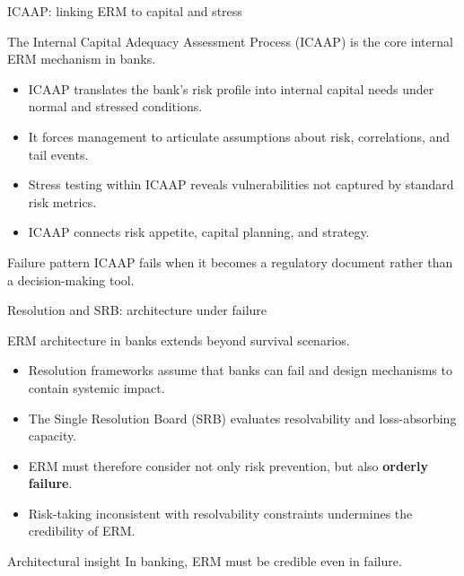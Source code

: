 \documentclass[aspectratio=169, 10pt]{beamer} %
\begin{document}
\begin{frame}{ICAAP: linking ERM to capital and stress}

The Internal Capital Adequacy Assessment Process (ICAAP)
is the core internal ERM mechanism in banks.

\medskip

\begin{itemize}
  \item[$\bullet$] ICAAP translates the bank’s risk profile into internal
  capital needs under normal and stressed conditions.

  \item[$\bullet$] It forces management to articulate assumptions about
  risk, correlations, and tail events.

  \item[$\bullet$] Stress testing within ICAAP reveals vulnerabilities
  not captured by standard risk metrics.

  \item[$\bullet$] ICAAP connects risk appetite, capital planning, and strategy.
\end{itemize}

\begin{block}{Failure pattern}
ICAAP fails when it becomes a regulatory document rather than a
decision-making tool.
\end{block}

\end{frame}

\begin{frame}{Resolution and SRB: architecture under failure}

ERM architecture in banks extends beyond survival scenarios.

\medskip

\begin{itemize}
  \item[$\bullet$] Resolution frameworks assume that banks can fail and
  design mechanisms to contain systemic impact.

  \item[$\bullet$] The Single Resolution Board (SRB) evaluates resolvability
  and loss-absorbing capacity.

  \item[$\bullet$] ERM must therefore consider not only risk prevention,
  but also \textbf{orderly failure}.

  \item[$\bullet$] Risk-taking inconsistent with resolvability constraints
  undermines the credibility of ERM.
\end{itemize}

\begin{block}{Architectural insight}
In banking, ERM must be credible even in failure.
\end{block}

\end{frame}
\end{document}
